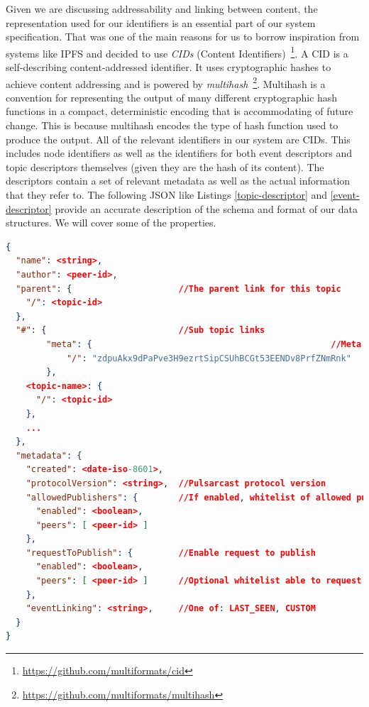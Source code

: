Given we are discussing addressability and linking between content, the
representation used for our identifiers is an essential part of our system
specification. That was one of the main reasons for us to borrow inspiration
from systems like IPFS and decided to use \emph{CIDs} (Content
Identifiers)~\footnote{\url{https://github.com/multiformats/cid}}.  A CID is a
self-describing content-addressed identifier. It uses cryptographic hashes to
achieve content addressing and is powered by
\emph{multihash}~\footnote{\url{https://github.com/multiformats/multihash}}.
Multihash is a convention for representing the output of many different
cryptographic hash functions in a compact, deterministic encoding that is
accommodating of future change. This is because multihash encodes the type of
hash function used to produce the output. All of the relevant identifiers in
our system are CIDs. This includes node identifiers as well as the identifiers
for both event descriptors and topic descriptors themselves (given they are the
hash of its content). The descriptors contain a set of relevant metadata as
well as the actual information that they refer to. The following JSON like
Listings \ref{topic-descriptor} and \ref{event-descriptor} provide an accurate
description of the schema and format of our data structures. We will cover some
of the properties.

\begin{lstlisting}[float, language=JSON,caption={Topic descriptor schema in a JSON based format},label={topic-descriptor}]
{
  "name": <string>,
  "author": <peer-id>,
  "parent": {                     //The parent link for this topic
    "/": <topic-id>
  },
  "#": {                          //Sub topic links
		"meta": {												//Meta topic
			"/": "zdpuAkx9dPaPve3H9ezrtSipCSUhBCGt53EENDv8PrfZNmRnk"
		},
    <topic-name>: {
      "/": <topic-id>
    },
    ...
  },
  "metadata": {
    "created": <date-iso-8601>,
    "protocolVersion": <string>,  //Pulsarcast protocol version
    "allowedPublishers": {        //If enabled, whitelist of allowed publishers
      "enabled": <boolean>,
      "peers": [ <peer-id> ]
    },
    "requestToPublish": {         //Enable request to publish
      "enabled": <boolean>,
      "peers": [ <peer-id> ]      //Optional whitelist able to request
    },
    "eventLinking": <string>,     //One of: LAST_SEEN, CUSTOM
  }
}
\end{lstlisting}

